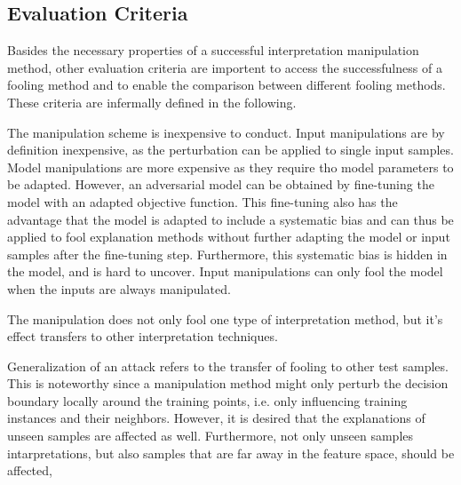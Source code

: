 
\subsection{Evaluation Criteria}
\label{subsec:eval_criteria_manipulations}
Basides the necessary properties of a successful interpretation manipulation method, other evaluation criteria are importent to access the successfulness of a fooling method and to enable the comparison between different fooling methods. These criteria are infermally defined in the following.

 The manipulation scheme is inexpensive to conduct. Input manipulations are by definition inexpensive, as the perturbation can be applied to single input samples. Model manipulations are more expensive as they require tho model parameters to be adapted. However, an adversarial model can be obtained by fine-tuning the model with an adapted objective function. This fine-tuning also has the advantage that the model is adapted to include a systematic bias and can thus be applied to fool explanation methods without further adapting the model or input samples after the fine-tuning step. Furthermore, this systematic bias is hidden in the model, and is hard to uncover. Input manipulations can only fool the model when the inputs are always manipulated. 

 The manipulation does not only fool one type of interpretation method, but it's effect transfers to other interpretation techniques. 


 Generalization of an attack refers to the transfer of fooling to other test samples. This is noteworthy since a manipulation method might only perturb the decision boundary locally around the training points, i.e. only influencing training instances and their neighbors. However, it is desired that the explanations of unseen samples are affected as well. Furthermore, not only unseen samples intarpretations, but also samples that are far away in the feature space, should be affected,

